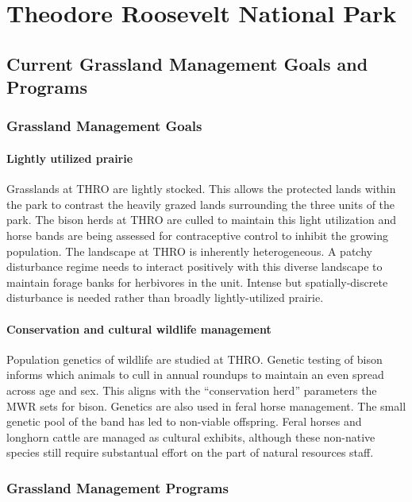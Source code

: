\section{Theodore Roosevelt National Park}

\subsection{Current Grassland Management Goals and Programs}

\subsubsection{Grassland Management Goals}

\paragraph{Lightly utilized prairie}
Grasslands at THRO are lightly stocked. 
This allows the protected lands within the park to contrast the heavily grazed lands surrounding the three units of the park. 
The bison herds at THRO are culled to maintain this light utilization and horse bands are being assessed for contraceptive control to inhibit the growing population. 
The landscape at THRO is inherently heterogeneous. 
A patchy disturbance regime needs to interact positively with this diverse landscape to maintain forage banks for herbivores in the unit. 
Intense but spatially-discrete disturbance is needed rather than broadly lightly-utilized prairie.

\paragraph{Conservation and cultural wildlife management} 
Population genetics of wildlife are studied at THRO. 
Genetic testing of bison informs which animals to cull in annual roundups to maintain an even spread across age and sex. 
This aligns with the ``conservation herd'' parameters the MWR sets for bison. 
Genetics are also used in feral horse management. 
The small genetic pool of the band has led to non-viable offspring. 
Feral horses and longhorn cattle are managed as cultural exhibits, although these non-native species still require substantual effort on the part of natural resources staff.

\subsubsection{Grassland Management Programs}

